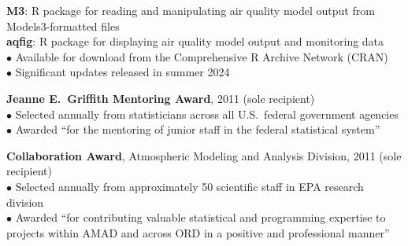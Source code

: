\documentclass[11pt]{article}
\def\newsectn{\vspace*{0.6cm}}
\def\newitem{\vspace*{0.2cm}}
\begin{document}
\newsectn
{}


\textbf{M3}: R package for reading and manipulating air quality model
output from Models3-formatted files\\
\textbf{aqfig}: R package for displaying air quality model output and
monitoring data\\
$\bullet$ Available for download from the Comprehensive R Archive Network
(CRAN)\\
$\bullet$ Significant updates released in summer 2024






\newsectn
{}

\textbf{Jeanne E.~Griffith Mentoring Award}, 2011 (sole recipient)\\  %
$\bullet$ Selected annually from statisticians across all U.S.~federal government agencies\\
$\bullet$ Awarded ``for the mentoring of junior staff in the federal statistical
system''

\newitem
\textbf{Collaboration Award}, Atmospheric Modeling and Analysis Division, 2011 (sole recipient)\\
$\bullet$ Selected annually from approximately 50 scientific staff in EPA research
division\\
$\bullet$ Awarded ``for contributing valuable statistical and programming
expertise to projects within AMAD and across ORD in a positive and professional
manner''\\
\end{document}
